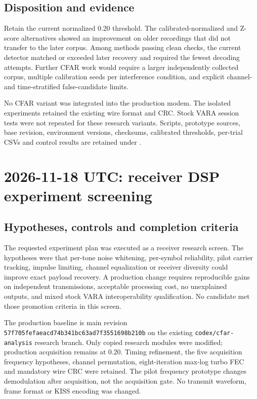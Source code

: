 \documentclass[11pt,a4paper]{article}
\newcommand{\pathtext}[1]{\path{#1}}
\begin{document}
\subsection{Disposition and evidence}

Retain the current normalized 0.20 threshold. The calibrated-normalized
and Z-score alternatives showed an improvement on older recordings that
did not transfer to the later corpus. Among methods passing clean checks, the current detector matched or
exceeded later recovery and required the fewest decoding attempts.
Further CFAR work would require a larger independently collected corpus,
multiple calibration seeds per interference condition, and explicit
channel- and time-stratified false-candidate limits.

No CFAR variant was integrated into the production modem. The isolated
experiments retained the existing wire format and CRC. Stock VARA session
tests were not repeated for these research variants. Scripts, prototype
sources, base revision, environment versions, checksums, calibrated
thresholds, per-trial CSVs and control results are retained under
\pathtext{2026-11-15-main-retest.sajUbP/cfar-2026-11-18}.

\section{2026-11-18 UTC: receiver DSP experiment screening}
\label{sec:dsp-screening-nov18}

\subsection{Hypotheses, controls and completion criteria}
The requested experiment plan was executed as a receiver research screen.
The hypotheses were that per-tone noise whitening, per-symbol reliability,
pilot carrier tracking, impulse limiting, channel equalization or receiver
diversity could improve exact payload recovery. A production change requires
reproducible gains on independent transmissions, acceptable processing cost,
no unexplained outputs, and mixed stock VARA interoperability qualification.
No candidate met those promotion criteria in this screen.

The production baseline is main revision
\texttt{57f705fefaeacd74b341bc63ad7f3551698b210b} on the existing
\texttt{codex/cfar-analysis} research branch. Only copied research modules were
modified; production acquisition remains at 0.20. Timing refinement, the five
acquisition frequency hypotheses, channel permutation, eight-iteration
max-log turbo FEC and mandatory wire CRC were retained. The pilot frequency
prototype changes demodulation after acquisition, not the acquisition gate.
No transmit waveform, frame format or KISS encoding was changed.
\end{document}
